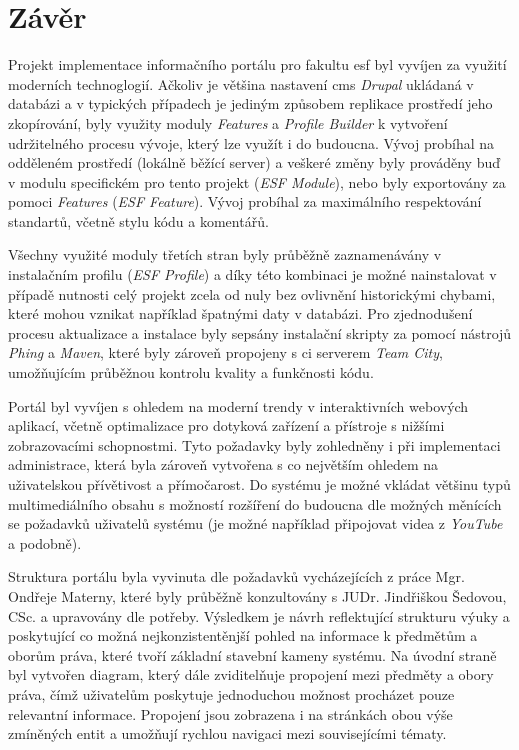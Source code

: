 \chapter{Závěr}

Projekt implementace informačního portálu pro fakultu \gls{esf} byl vyvíjen za využití moderních technoglogií. Ačkoliv je většina nastavení \gls{cms} \emph{Drupal} ukládaná v databázi a v typických případech je jediným způsobem replikace prostředí jeho zkopírování, byly využity moduly \emph{Features} a \emph{Profile Builder} k vytvoření udržitelného procesu vývoje, který lze využít i do budoucna. Vývoj probíhal na odděleném prostředí (lokálně běžící server) a veškeré změny byly prováděny buď v modulu specifickém pro tento projekt (\emph{ESF Module}), nebo byly exportovány za pomoci \emph{Features} (\emph{ESF Feature}). Vývoj probíhal za maximálního respektování standartů, včetně stylu kódu a komentářů. 

Všechny využité moduly třetích stran byly průběžně zaznamenávány v instalačním profilu (\emph{ESF Profile}) a díky této kombinaci je možné nainstalovat v případě nutnosti celý projekt zcela od nuly bez ovlivnění historickými chybami, které mohou vznikat například špatnými daty v databázi. Pro zjednodušení procesu aktualizace a instalace byly sepsány instalační skripty za pomocí nástrojů \emph{Phing} a \emph{Maven}, které byly zároveň propojeny s \gls{ci} 
serverem \emph{Team City}, umožňujícím průběžnou kontrolu kvality a funkčnosti kódu.

Portál byl vyvíjen s ohledem na moderní trendy v interaktivních webových aplikací, včetně optimalizace pro dotyková zařízení a přístroje s nižšími zobrazovacími schopnostmi. Tyto požadavky byly zohledněny i při implementaci administrace, která byla zároveň vytvořena s co největším ohledem na uživatelskou přívětivost a přímočarost. Do systému je možné vkládat většinu typů multimediálního obsahu s možností rozšíření do budoucna dle možných měnících se požadavků uživatelů systému (je možné například připojovat videa z \emph{YouTube} a podobně).

Struktura portálu byla vyvinuta dle požadavků vycházejících z práce Mgr. Ondřeje Materny, které byly průběžně konzultovány s JUDr. Jindřiškou Šedovou, CSc. a upravovány dle potřeby. Výsledkem je návrh reflektující strukturu výuky a poskytující co možná nejkonzistentěnjší pohled na informace k předmětům a oborům práva, které tvoří základní stavební kameny systému. Na úvodní straně byl vytvořen diagram, který dále zviditelňuje propojení mezi předměty a obory práva, čímž uživatelům poskytuje jednoduchou možnost procházet pouze relevantní informace. Propojení jsou zobrazena i na stránkách obou výše zmíněných entit a umožňují rychlou navigaci mezi souvisejícími tématy. 

